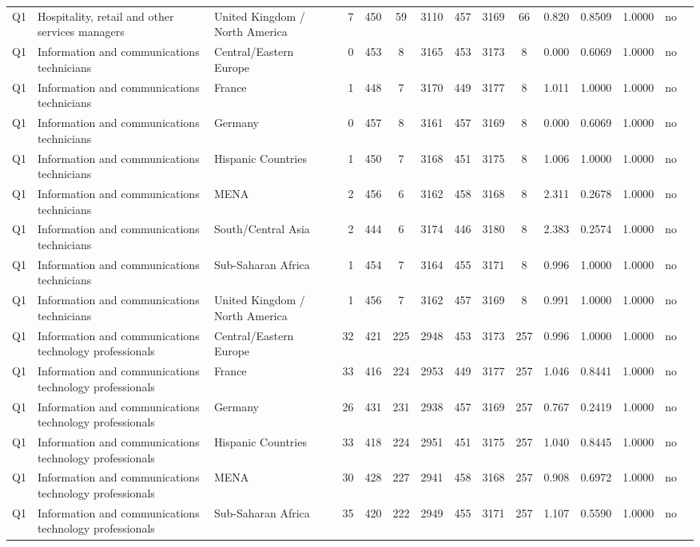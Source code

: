 \begin{longtable}{lllrcccccccccll}
Q1 & Hospitality, retail and other services managers & United Kingdom / North America & 7 & 450 & 59 & 3110 & 457 & 3169 & 66 & 0.820 & 0.8509 & 1.0000 & no \\
Q1 & Information and communications technicians & Central/Eastern Europe & 0 & 453 & 8 & 3165 & 453 & 3173 & 8 & 0.000 & 0.6069 & 1.0000 & no \\
Q1 & Information and communications technicians & France & 1 & 448 & 7 & 3170 & 449 & 3177 & 8 & 1.011 & 1.0000 & 1.0000 & no \\
Q1 & Information and communications technicians & Germany & 0 & 457 & 8 & 3161 & 457 & 3169 & 8 & 0.000 & 0.6069 & 1.0000 & no \\
Q1 & Information and communications technicians & Hispanic Countries & 1 & 450 & 7 & 3168 & 451 & 3175 & 8 & 1.006 & 1.0000 & 1.0000 & no \\
Q1 & Information and communications technicians & MENA & 2 & 456 & 6 & 3162 & 458 & 3168 & 8 & 2.311 & 0.2678 & 1.0000 & no \\
Q1 & Information and communications technicians & South/Central Asia & 2 & 444 & 6 & 3174 & 446 & 3180 & 8 & 2.383 & 0.2574 & 1.0000 & no \\
Q1 & Information and communications technicians & Sub-Saharan Africa & 1 & 454 & 7 & 3164 & 455 & 3171 & 8 & 0.996 & 1.0000 & 1.0000 & no \\
Q1 & Information and communications technicians & United Kingdom / North America & 1 & 456 & 7 & 3162 & 457 & 3169 & 8 & 0.991 & 1.0000 & 1.0000 & no \\
Q1 & Information and communications technology professionals & Central/Eastern Europe & 32 & 421 & 225 & 2948 & 453 & 3173 & 257 & 0.996 & 1.0000 & 1.0000 & no \\
Q1 & Information and communications technology professionals & France & 33 & 416 & 224 & 2953 & 449 & 3177 & 257 & 1.046 & 0.8441 & 1.0000 & no \\
Q1 & Information and communications technology professionals & Germany & 26 & 431 & 231 & 2938 & 457 & 3169 & 257 & 0.767 & 0.2419 & 1.0000 & no \\
Q1 & Information and communications technology professionals & Hispanic Countries & 33 & 418 & 224 & 2951 & 451 & 3175 & 257 & 1.040 & 0.8445 & 1.0000 & no \\
Q1 & Information and communications technology professionals & MENA & 30 & 428 & 227 & 2941 & 458 & 3168 & 257 & 0.908 & 0.6972 & 1.0000 & no \\
Q1 & Information and communications technology professionals & Sub-Saharan Africa & 35 & 420 & 222 & 2949 & 455 & 3171 & 257 & 1.107 & 0.5590 & 1.0000 & no \\

\end{longtable}

